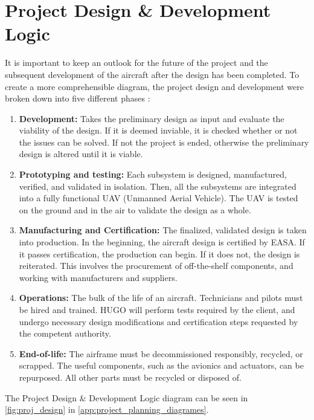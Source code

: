 \section{Project Design \& Development Logic}
\label{sec:pdd_logic}

It is important to keep an outlook for the future of the project and the subsequent development of the aircraft after the design has been completed. To create a more comprehensible diagram, the project design and development were broken down into five different phases \cite{Spitz2001}: 

\begin{enumerate}
    \item \textbf{Development:} Takes the preliminary design as input and evaluate the viability of the design. If it is deemed inviable, it is checked whether or not the issues can be solved. If not the project is ended, otherwise the preliminary design is altered until it is viable.   
    \item \textbf{Prototyping and testing:} Each subsystem is designed, manufactured, verified, and validated in isolation. Then, all the subsystems are integrated into a fully functional UAV (Unmanned Aerial Vehicle). The UAV is tested on the ground and in the air to validate the design as a whole.
    \item \textbf{Manufacturing and Certification:} The finalized, validated design is taken into production. In the beginning, the aircraft design is certified by EASA. If it passes certification, the production can begin. If it does not, the design is reiterated. This involves the procurement of off-the-shelf components, and working with manufacturers and suppliers. 
    \item \textbf{Operations:} The bulk of the life of an aircraft. Technicians and pilots must be hired and trained. %
    HUGO will perform tests required by the client, and undergo necessary design modifications and certification steps requested by the competent authority.
    \item \textbf{End-of-life:} The airframe must be decommissioned responsibly, recycled, or scrapped. The useful components, such as the avionics and actuators, can be repurposed. All other parts must be recycled or disposed of.%
\end{enumerate}
The Project Design \& Development Logic diagram can be seen in \autoref{fig:proj_design} in \autoref{app:project_planning_diagrames}.

